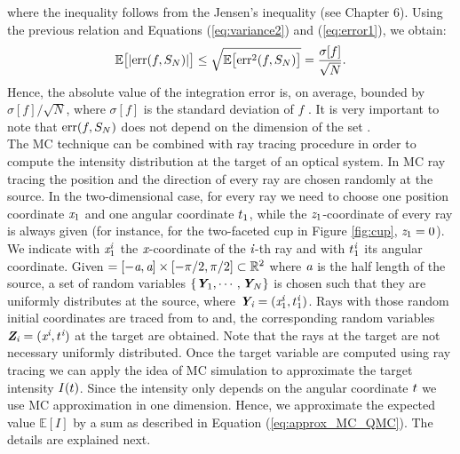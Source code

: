 where the inequality follows from the Jensen's inequality (see \cite{williams1991probability} Chapter $6$).
Using the previous relation and Equations (\ref{eq:variance2}) and (\ref{eq:error1}), we obtain:
\begin{equation}\label{eq:mean_error}
\mathbb{E}\big[|\textrm{err}(f, S_{N})|\big]\leq
\sqrt{\mathbb{E}\big[\textrm{err}^2(f, S_{N})\big]} = \frac{\sigma[f]}{\sqrt{N}}.
\end{equation}
Hence, the absolute value of the integration error is, on average, bounded by $\sigma[f]/\sqrt{N}$, where $\sigma[f]$ is the standard deviation of $f$ \cite{leobacher2014introduction}. It is very important to note that $\textrm{err}(f, S_{N})$ does not depend on the dimension of the set .
\\ \indent The MC technique can be combined with ray tracing procedure in order to compute the intensity distribution at the target of an optical system.
In MC ray tracing the position and the direction of every ray are chosen randomly at the source.
In the two-dimensional case, for every ray we need to choose one position coordinate $\textit{x}_1$ and one angular coordinate $t_1$, while the $\textit{z}_1$-coordinate of every ray is always given (for instance, for the two-faceted cup in Figure \ref{fig:cup}, $\textit{z}_1=0$). We indicate with $\textit{x}_{1}^{\textit{i}}$ the $\textit{x}$-coordinate of the $\textit{i}$-th ray and with $t_1^{\textit{i}}$ its angular coordinate. Given $=[-\textit{a}, \textit{a}]\times[-\pi/2, \pi/2]\subset\mathbb{R}^2$ where $\textit{a}$ is the half length of the source, a set of random variables $\{\textit{\textbf{Y}}_1, \cdots, \textit{\textbf{Y}}_N\}$ is chosen such that they are uniformly distributes at the source, where $\textit{\textbf{Y}}_{\textit{i}}= (\textit{x}_{1}^{\textit{i}},t_1^{\textit{i}})$.
Rays with those random initial coordinates are traced from  to  and, the corresponding random variables $\textit{\textbf{Z}}_{\textit{i}}=(\textit{x}^{\textit{i}},t^{\textit{i}})$ at the target are obtained. Note that the rays at the target are not necessary uniformly distributed. Once the target variable are computed using ray tracing we can apply the idea of MC simulation to approximate the target intensity $I(t)$. Since the intensity only depends on the angular coordinate $t$ we use MC approximation in one dimension. Hence, we approximate the expected value $\mathbb{E}[I]$ by a sum as described in Equation (\ref{eq:approx_MC_QMC}). The details are explained next.
